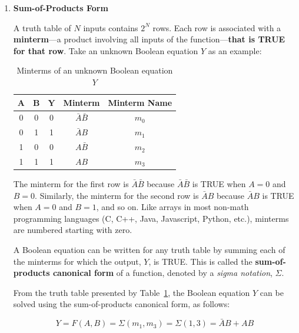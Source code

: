\documentclass[12pt]{article}
\begin{document}
\begin{enumerate}
    \item \textbf{Sum-of-Products Form}

    A truth table of $N$ inputs contains $2^N$ rows. Each row is associated with a \textbf{minterm}---a product involving all inputs of the function---\textbf{that is TRUE for that row}. Take an unknown Boolean equation $Y$ as an example:

    \begin{table}[h]
        \centering
        \begin{tabular}{ | c | c | c | c | c | }
        \hline \rule{0em}{1em}
        $\mathbf{A}$ & $\mathbf{B}$ & $\mathbf{Y}$ & \textbf{Minterm} & \textbf{Minterm Name} \\ \hline \rule{0em}{1em}
        0            & 0            & 0            & $\bar{A}\bar{B}$ & $m_0$                 \\ \hline \rule{0em}{1em}
        0            & 1            & 1            & $\bar{A}B$       & $m_1$                 \\ \hline \rule{0em}{1em}
        1            & 0            & 0            & $A\bar{B}$       & $m_2$                 \\ \hline \rule{0em}{1em}
        1            & 1            & 1            & $AB$             & $m_3$                 \\ \hline
        \end{tabular}
        \caption{Minterms of an unknown Boolean equation $Y$}
        \label{table:2}
    \end{table}

    The minterm for the first row is $\bar{A}\bar{B}$ because $\bar{A}\bar{B}$ is TRUE when $A = 0$ and $B = 0$. Similarly, the minterm for the second row is $\bar{A}B$ because $\bar{A}B$ is TRUE when $A = 0$ and $B = 1$, and so on. Like arrays in most non-math programming languages (C, C++, Java, Javascript, Python, etc.), minterms are numbered starting with zero.

    A Boolean equation can be written for any truth table by summing each of the minterms for which the output, $Y$, is TRUE. This is called the \textbf{sum-of-products canonical form} of a function, denoted by a \textit{sigma notation}, $\Sigma$.

    From the truth table presented by Table~\ref{table:2}, the Boolean equation $Y$ can be solved using the sum-of-products canonical form, as follows:

    \begin{equation} \label{equation:3}
        Y = F(A, B) = \Sigma(m_1, m_3) = \Sigma(1, 3) = \bar{A}B + AB
    \end{equation}


\end{enumerate}
\end{document}

